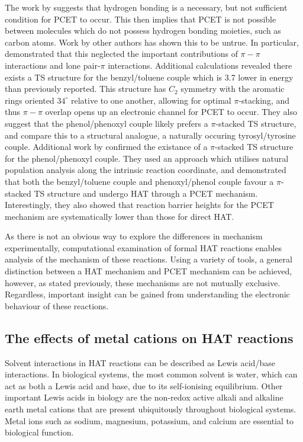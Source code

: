 The work by \citet{Mayer2002} suggests that hydrogen bonding is a necessary, but not sufficient condition for PCET to occur. This then implies that PCET is not possible between molecules which do not possess hydrogen bonding moieties, such as carbon atoms. Work by other authors has shown this to be untrue.\cite{Hatcher2007,DiLabio2007} In particular, \citet{DiLabio2007} demonstrated that this neglected the important contributions of $\pi-\pi$ interactions and lone pair-$\pi$ interactions. Additional calculations revealed there exists a TS structure for the benzyl/toluene couple which is 3.7 \kcalmol lower in energy than previously reported. This structure has $C_2$ symmetry with the aromatic rings oriented $34^\circ$ relative to one another, allowing for optimal $\pi$-stacking, and thus $\pi-\pi$ overlap opens up an electronic channel for PCET to occur. They also suggest that the phenol/phenoxyl couple likely prefers a $\pi$-stacked TS structure, and compare this to a structural analogue, a naturally occuring tyrosyl/tyrosine couple. Additional work by \citet{Munoz-Rugeles2017} confirmed the existance of a $\pi$-stacked TS structure for the phenol/phenoxyl couple. They used an approach which utilises natural population analysis along the intrinsic reaction coordinate, and demonstrated that both the benzyl/toluene couple and phenoxyl/phenol couple favour a $\pi$-stacked TS structure and undergo HAT through a PCET mechanism. Interestingly, they also showed that reaction barrier heights for the PCET mechanism are systematically lower than those for direct HAT.

As there is not an obvious way to explore the differences in mechanism experimentally, computational examination of formal HAT reactions enables analysis of the mechanism of these reactions. Using a variety of tools, a general distinction between a HAT mechanism and PCET mechanism can be achieved, however, as stated previously, these mechanisms are not mutually exclusive. Regardless, important insight can be gained from understanding the electronic behaviour of these reactions.


\subsection{The effects of metal cations on HAT reactions}

Solvent interactions in HAT reactions can be described as Lewis acid/base
interactions. In biological systems, the most common solvent is water, which can
act as both a Lewis acid and base, due to its self-ionising equilibrium. Other
important Lewis acids in biology are the non-redox active alkali and alkaline
earth metal cations that are present ubiquitously throughout biological
systems. Metal ions such as sodium, magnesium, potassium, and calcium are
essential to biological function.\cite{Karp2013} 

